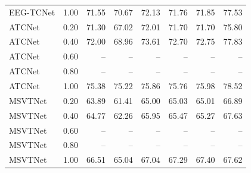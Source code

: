 \begin{table}[!t]
{\begin{tabular}{l c r r r r r r}
EEG-TCNet & 1.00 & 71.55 & 70.67 & 72.13 & 71.76 & 71.85 & 77.53 \\
\addlinespace
ATCNet & 0.20 & 71.30 & 67.02 & 72.01 & 71.70 & 71.70 & 75.80 \\
ATCNet & 0.40 & 72.00 & 68.96 & 73.61 & 72.70 & 72.75 & 77.83 \\
ATCNet & 0.60 & -- & -- & -- & -- & -- & -- \\
ATCNet & 0.80 & -- & -- & -- & -- & -- & -- \\
ATCNet & 1.00 & 75.38 & 75.22 & 75.86 & 75.76 & 75.98 & 78.52 \\
\addlinespace
MSVTNet & 0.20 & 63.89 & 61.41 & 65.00 & 65.03 & 65.01 & 66.89 \\
MSVTNet & 0.40 & 64.77 & 62.26 & 65.95 & 65.47 & 65.27 & 67.63 \\
MSVTNet & 0.60 & -- & -- & -- & -- & -- & -- \\
MSVTNet & 0.80 & -- & -- & -- & -- & -- & -- \\
MSVTNet & 1.00 & 66.51 & 65.04 & 67.04 & 67.29 & 67.40 & 67.62 \\
\bottomrule
\end{tabular}
}
\end{table}

